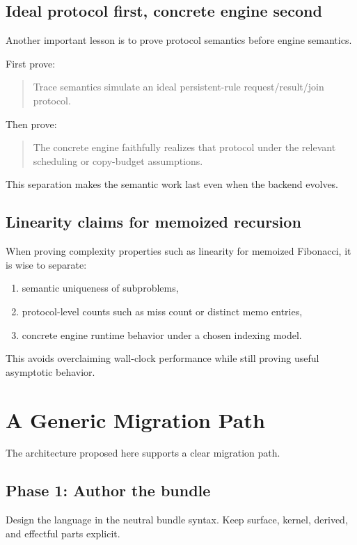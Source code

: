 \documentclass[11pt]{article}
\begin{document}
\subsection{Ideal protocol first, concrete engine second}

Another important lesson is to prove protocol semantics before engine semantics.

First prove:
\begin{quote}
Trace semantics simulate an ideal persistent-rule request/result/join protocol.
\end{quote}

Then prove:
\begin{quote}
The concrete engine faithfully realizes that protocol under the relevant scheduling or copy-budget assumptions.
\end{quote}

This separation makes the semantic work last even when the backend evolves.

\subsection{Linearity claims for memoized recursion}

When proving complexity properties such as linearity for memoized Fibonacci, it is wise to separate:
\begin{enumerate}[leftmargin=2em]
  \item semantic uniqueness of subproblems,
  \item protocol-level counts such as miss count or distinct memo entries,
  \item concrete engine runtime behavior under a chosen indexing model.
\end{enumerate}

This avoids overclaiming wall-clock performance while still proving useful asymptotic behavior.

\section{A Generic Migration Path}

The architecture proposed here supports a clear migration path.

\subsection{Phase 1: Author the bundle}

Design the language in the neutral bundle syntax. Keep surface, kernel, derived, and effectful parts explicit.
\end{document}

